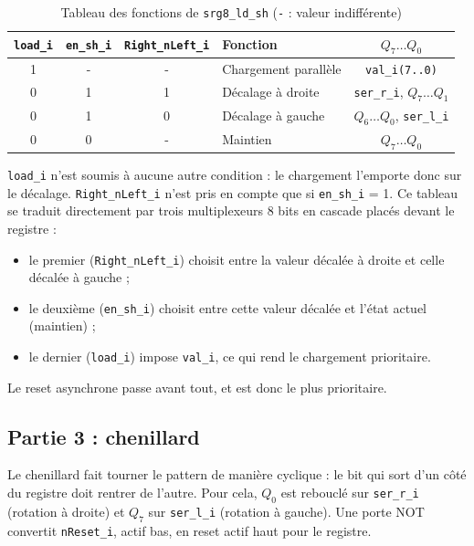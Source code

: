 \begin{table}[H]
  \centering
  \small
  \begin{tabular}{c c c l c}
    \hline
    \texttt{load\_i} & \texttt{en\_sh\_i} & \texttt{Right\_nLeft\_i} & \textbf{Fonction} & $Q_7 \dots Q_0$ \\
    \hline
    1 & - & - & Chargement parallèle & \texttt{val\_i(7..0)} \\
    0 & 1 & 1 & Décalage à droite    & \texttt{ser\_r\_i}, $Q_7 \dots Q_1$ \\
    0 & 1 & 0 & Décalage à gauche    & $Q_6 \dots Q_0$, \texttt{ser\_l\_i} \\
    0 & 0 & - & Maintien             & $Q_7 \dots Q_0$ \\
    \hline
  \end{tabular}
  \caption{Tableau des fonctions de \texttt{srg8\_ld\_sh} (\texttt{-} : valeur indifférente)}
  \label{tab:fct_sync}
\end{table}

\texttt{load\_i} n'est soumis à aucune autre condition : le chargement l'emporte donc sur le décalage. \texttt{Right\_nLeft\_i} n'est pris en compte que si \texttt{en\_sh\_i} = 1. Ce tableau se traduit directement par trois multiplexeurs 8 bits en cascade placés devant le registre :
\begin{itemize}
  \item le premier (\texttt{Right\_nLeft\_i}) choisit entre la valeur décalée à droite et celle décalée à gauche ;
  \item le deuxième (\texttt{en\_sh\_i}) choisit entre cette valeur décalée et l'état actuel (maintien) ;
  \item le dernier (\texttt{load\_i}) impose \texttt{val\_i}, ce qui rend le chargement prioritaire.
\end{itemize}
Le reset asynchrone passe avant tout, et est donc le plus prioritaire.


\subsection{Partie 3 : chenillard}

Le chenillard fait tourner le pattern de manière cyclique : le bit qui sort d'un côté du registre doit rentrer de l'autre. Pour cela, $Q_0$ est rebouclé sur \texttt{ser\_r\_i} (rotation à droite) et $Q_7$ sur \texttt{ser\_l\_i} (rotation à gauche). Une porte NOT convertit \texttt{nReset\_i}, actif bas, en reset actif haut pour le registre.

